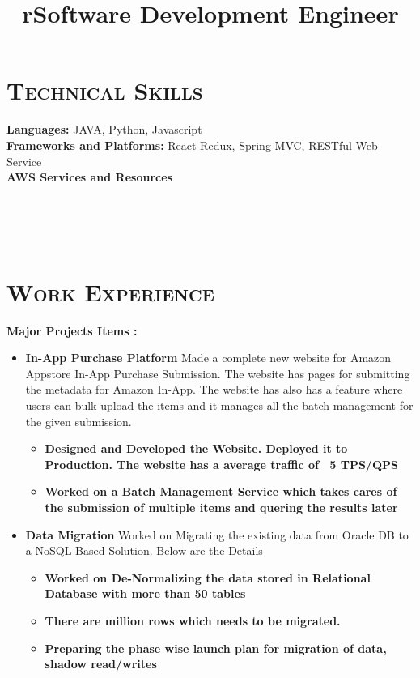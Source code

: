 \begin{resume}


\section{\textsc{Technical Skills}}
\textbf{Languages:}  JAVA, Python, Javascript \\
\textbf{Frameworks and Platforms:}  React-Redux, Spring-MVC, RESTful Web Service \\
\textbf{AWS Services and Resources}



\begin{formatb}
  \title{r}\\
  \\
  \body\\
\end{formatb}

\section{\textsc{Work Experience}}


\title{Software Development Engineer}
\begin{position}
\textbf{Major Projects Items :}
\begin{itemize}
\item \textbf{In-App Purchase Platform} Made a complete new website for Amazon Appstore In-App Purchase Submission. The website has pages for submitting the metadata for Amazon In-App. The website has also has a feature where users can bulk upload the items and it manages all the batch management for the given submission.

\begin{itemize}
    \item \textbf{Designed and Developed the Website. Deployed it to Production. The website has a average traffic of ~5 TPS/QPS}
    \item \textbf{Worked on a Batch Management Service which takes cares of the submission of multiple items and quering the results later }
\end{itemize}


\item \textbf{Data Migration} Worked on Migrating the existing data from Oracle DB to a NoSQL Based Solution. Below are the Details

\begin{itemize}
    \item \textbf{Worked on De-Normalizing the data stored in Relational Database with more than 50 tables}
    \item \textbf{There are million rows which needs to be migrated.}
    \item \textbf{Preparing the phase wise launch plan for migration of data, shadow read/writes}
\end{itemize}


\end{itemize}
\end{position}
\end{resume}
